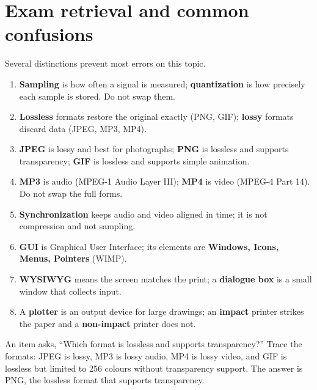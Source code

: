 \section{Exam retrieval and common confusions}
Several distinctions prevent most errors on this topic.
\begin{enumerate}
  \item \textbf{Sampling} is how often a signal is measured; \textbf{quantization}
    is how precisely each sample is stored. Do not swap them.
  \item \textbf{Lossless} formats restore the original exactly (PNG, GIF);
    \textbf{lossy} formats discard data (JPEG, MP3, MP4).
  \item \textbf{JPEG} is lossy and best for photographs; \textbf{PNG} is
    lossless and supports transparency; \textbf{GIF} is lossless and supports
    simple animation.
  \item \textbf{MP3} is audio (MPEG-1 Audio Layer III); \textbf{MP4} is video
    (MPEG-4 Part 14). Do not swap the full forms.
  \item \textbf{Synchronization} keeps audio and video aligned in time; it is
    not compression and not sampling.
  \item \textbf{GUI} is Graphical User Interface; its elements are
    \textbf{Windows, Icons, Menus, Pointers} (WIMP).
  \item \textbf{WYSIWYG} means the screen matches the print; a \textbf{dialogue
    box} is a small window that collects input.
  \item A \textbf{plotter} is an output device for large drawings; an
    \textbf{impact} printer strikes the paper and a \textbf{non-impact} printer
    does not.
\end{enumerate}

\begin{example}
An item asks, ``Which format is lossless and supports transparency?'' Trace
the formats: JPEG is lossy, MP3 is lossy audio, MP4 is lossy video, and GIF is
lossless but limited to 256 colours without transparency support. The answer
is PNG, the lossless format that supports transparency.
\end{example}

